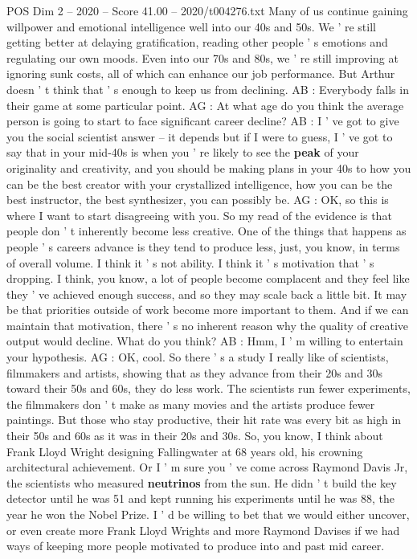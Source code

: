 \begin{textsample}{POS Dim 2 – 2020 – Score 41.00 – 2020/t004276.txt}
Many of us continue gaining willpower and emotional intelligence well into our 40s and 50s.
We ' re still getting better at delaying gratification, reading other people ' s emotions and regulating our own moods.
Even into our 70s and 80s, we ' re still improving at ignoring sunk costs, all of which can enhance our job performance.
But Arthur doesn ' t think that ' s enough to keep us from declining.
AB : Everybody falls in their game at some particular point.
AG : At what age do you think the average person is going to start to face significant career decline?
AB : I ' ve got to give you the social scientist answer -- it depends but if I were to guess, I ' ve got to say that in your mid-40s is when you ' re likely to see the \textbf{peak} of your originality and creativity, and you should be making plans in your 40s to how you can be the best creator with your crystallized intelligence, how you can be the best instructor, the best synthesizer, you can possibly be.
AG : OK, so this is where I want to start disagreeing with you.
So my read of the evidence is that people don ' t inherently become less creative.
One of the things that happens as people ' s careers advance is they tend to produce less, just, you know, in terms of overall volume.
I think it ' s not ability.
I think it ' s motivation that ' s dropping.
I think, you know, a lot of people become complacent and they feel like they ' ve achieved enough success, and so they may scale back a little bit.
It may be that priorities outside of work become more important to them.
And if we can maintain that motivation, there ' s no inherent reason why the quality of creative output would decline.
What do you think?
AB : Hmm, I ' m willing to entertain your hypothesis.
AG : OK, cool.
So there ' s a study I really like of scientists, filmmakers and artists, showing that as they advance from their 20s and 30s toward their 50s and 60s, they do less work.
The scientists run fewer experiments, the filmmakers don ' t make as many movies and the artists produce fewer paintings.
But those who stay productive, their hit rate was every bit as high in their 50s and 60s as it was in their 20s and 30s.
So, you know, I think about Frank Lloyd Wright designing Fallingwater at 68 years old, his crowning architectural achievement.
Or I ' m sure you ' ve come across Raymond Davis Jr, the scientists who measured \textbf{neutrinos} from the sun.
He didn ' t build the key detector until he was 51 and kept running his experiments until he was 88, the year he won the Nobel Prize.
I ' d be willing to bet that we would either uncover, or even create more Frank Lloyd Wrights and more Raymond Davises if we had ways of keeping more people motivated to produce into and past mid career.

\end{textsample}
